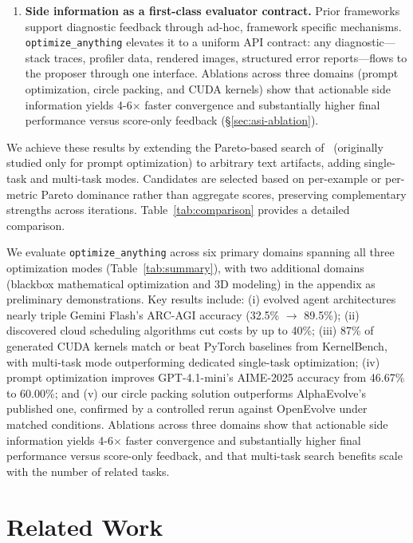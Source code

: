\documentclass[sigconf]{acmart}
\newcommand{\oa}{\texttt{optimize\_anything}}
\begin{document}
\begin{enumerate}[leftmargin=*,itemsep=2pt]
\item \textbf{Side information as a first-class evaluator contract.} Prior frameworks support diagnostic feedback through ad-hoc, framework specific mechanisms. \oa{} elevates it to a uniform API contract: any diagnostic---stack traces, profiler data, rendered images, structured error reports---flows to the proposer through one interface. Ablations across three domains (prompt optimization, circle packing, and CUDA kernels) show that actionable side information yields 4-6$\times$ faster convergence and substantially higher final performance versus score-only feedback (\S\ref{sec:asi-ablation}).
\end{enumerate}

We achieve these results by extending the Pareto-based search of~\citet{agrawal2026gepa} (originally studied only for prompt optimization) to arbitrary text artifacts, adding single-task and multi-task modes. Candidates are selected based on per-example or per-metric Pareto dominance rather than aggregate scores, preserving complementary strengths across iterations. Table~\ref{tab:comparison} provides a detailed comparison.

We evaluate \oa{} across six primary domains spanning all three optimization modes (Table~\ref{tab:summary}), with two additional domains (blackbox mathematical optimization and 3D modeling) in the appendix as preliminary demonstrations. Key results include: (i) evolved agent architectures nearly triple Gemini Flash's ARC-AGI accuracy (32.5\% $\to$ 89.5\%); (ii) discovered cloud scheduling algorithms cut costs by up to 40\%; (iii) 87\% of generated CUDA kernels match or beat PyTorch baselines from KernelBench, with multi-task mode outperforming dedicated single-task optimization; (iv) prompt optimization improves GPT-4.1-mini's AIME-2025 accuracy from 46.67\% to 60.00\%; and (v) our circle packing solution outperforms AlphaEvolve's published one, confirmed by a controlled rerun against OpenEvolve under matched conditions. Ablations across three domains show that actionable side information yields 4-6$\times$ faster convergence and substantially higher final performance versus score-only feedback, and that multi-task search benefits scale with the number of related tasks.

\section{Related Work}\label{sec:related}
\end{document}

